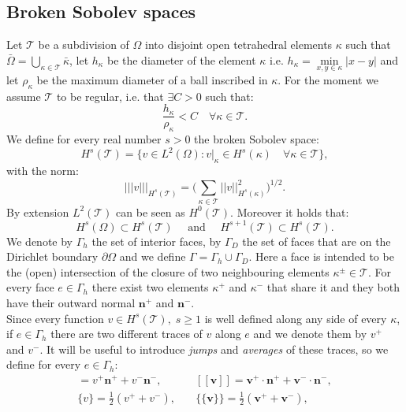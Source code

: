 \documentclass[12pt, a4paper]{article}
\theoremstyle{definition}
\theoremstyle{plain}
\theoremstyle{plain}
\theoremstyle{definition}
\begin{document}
\subsection{Broken Sobolev spaces}
Let $\mathcal{T}$ be a subdivision of $\Omega$ into disjoint open tetrahedral elements $\kappa$ such that $\bar{\Omega} = \bigcup\limits_{\kappa \in \mathcal{T}} \bar{\kappa}$, let $h_\kappa$ be the diameter of the element $\kappa$ i.e. $h_\kappa = \min\limits_{x, y \in \kappa} |x-y|$ and let $\rho_\kappa$ be the maximum diameter of a ball inscribed in $\kappa$. For the moment we assume $\mathcal{T}$ to be regular, i.e. that $\exists C > 0$ such that:
\begin{equation*}
	\frac{h_\kappa}{\rho_\kappa} < C \quad \forall \kappa \in \mathcal{T}.
\end{equation*}
We define for every real number $s>0$ the broken Sobolev space:
\begin{equation*}
	H^s(\mathcal{T}) = \{ v \in L^2(\Omega) : v|_\kappa \in H^s(\kappa) \quad 
	\forall \kappa \in \mathcal{T} \},
\end{equation*}
with the norm:
\begin{equation*}
	|\!|\!|v|\!|\!|_{H^s(\mathcal{T})} = \bigg( \sum_{\kappa \in \mathcal{T}} |\!|v|\!|_{H^s(\kappa)}^2 \bigg)^{1/2}.
\end{equation*}
By extension $L^2(\mathcal{T})$ can be seen as $H^0(\mathcal{T})$. Moreover it holds that:
\begin{equation*}
	H^s(\Omega) \subset H^s(\mathcal{T}) \quad \text{ and } \quad 
	H^{s+1}(\mathcal{T}) \subset H^s(\mathcal{T}).
\end{equation*}
We denote by $\Gamma_h$ the set of interior faces, by $\Gamma_D$ the set of 
faces that are on the Dirichlet boundary $\partial \Omega$ and we define $\Gamma = 
\Gamma_h \cup \Gamma_D$. Here a face is intended to be the (open) intersection 
of the closure of two neighbouring elements $\kappa^\pm \in \mathcal{T}$. For 
every face $e \in \Gamma_h$ there exist two elements 
$\kappa^+$ and $\kappa^-$ that share it and they both have their outward normal 
$\mathbf{n}^+$ and $\mathbf{n}^-$.\\
Since every function $v \in H^s(\mathcal{T}), \; s \geq 1$ is well defined 
along any side of every $\kappa$, if $e \in \Gamma_h$ there are two different 
traces of $v$ along $e$ and we denote them by $v^+$ and $v^-$.
It will be useful to introduce \emph{jumps} and \emph{averages} of these traces, so we 
define for every $e \in \Gamma_h$:
\begin{align}
	[v] = v^+ \mathbf{n}^+ + v^- \mathbf{n}^-,
	&\quad [\![ \mathbf{v} ]\!] = \mathbf{v}^+ \cdot \mathbf{n}^+ + \mathbf{v}^- \cdot \mathbf{n}^-, \label{eq:jump} \\
	\{v\} = \frac{1}{2} (v^+ + v^-) ,
	& \quad \{\!\!\{ \mathbf{v} \}\!\!\} = \frac{1}{2} (\mathbf{v}^+ +\mathbf{v}^-), \label{eq:aver}
\end{align}
\end{document}
